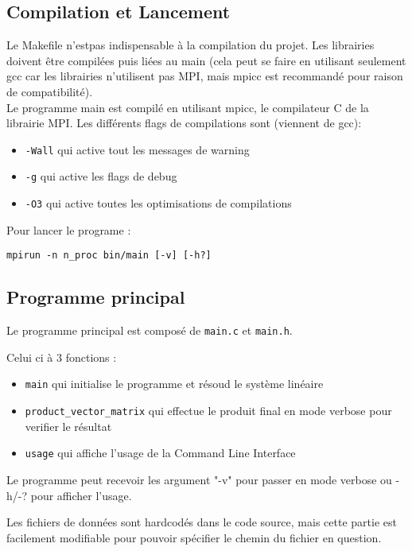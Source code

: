 \documentclass[11pt, a4paper]{article}
\begin{document}
\subsection{Compilation et Lancement}

Le Makefile n'estpas indispensable à la compilation du projet.
Les librairies doivent \^etre compilées puis liées au main (cela peut se faire en utilisant seulement gcc car les librairies n'utilisent pas MPI, mais mpicc est recommandé pour raison de compatibilité).\\

Le programme main est compilé en utilisant mpicc, le compilateur C de la librairie MPI. Les différents flags de compilations sont (viennent de gcc): 

\begin{itemize}
    \item \texttt{-Wall} qui active tout les messages de warning
    \item \texttt{-g} qui active les flags de debug
    \item \texttt{-O3} qui active toutes les optimisations de compilations
\end{itemize}

Pour lancer le programe : 

\texttt{mpirun -n n\_proc bin/main [-v] [-h?]}

\subsection{Programme principal}

Le programme principal est composé de \texttt{main.c} et \texttt{main.h}.

Celui ci à 3 fonctions :
\begin{itemize}
    \item \texttt{main} qui initialise le programme et résoud le système linéaire
    \item \texttt{product\_vector\_matrix} qui effectue le produit final en mode verbose pour verifier le résultat
    \item \texttt{usage} qui affiche l'usage de la Command Line Interface
\end{itemize}

Le programme peut recevoir les argument "-v" pour passer en mode verbose ou -h/-? pour afficher l'usage.

Les fichiers de données sont hardcodés dans le code source, mais cette partie est facilement modifiable pour pouvoir spécifier le chemin du fichier en question.\\
\end{document}

